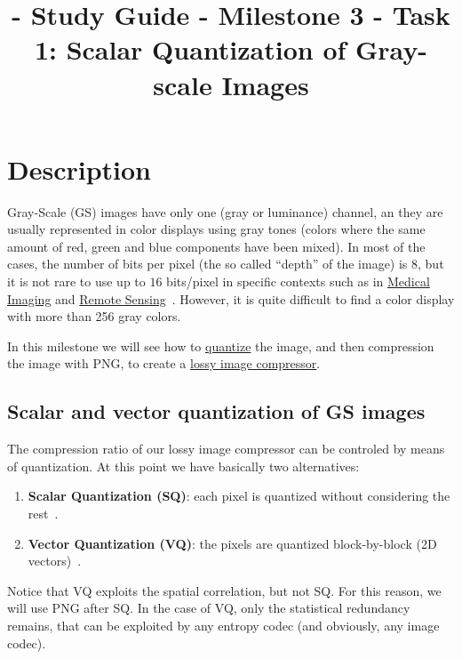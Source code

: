

\title{\SM{} - Study Guide - Milestone 3 - Task 1: Scalar Quantization of Gray-scale Images}

\maketitle
\tableofcontents

\section{Description}

Gray-Scale (GS) images have only one (gray or luminance) channel, an
they are usually represented in color displays using gray tones
(colors where the same amount of red, green and blue components have
been mixed). In most of the cases, the number of bits per pixel (the
so called ``depth'' of the image) is $8$, but it is not rare to use up
to $16$ bits/pixel in specific contexts such as in
\href{https://en.wikipedia.org/wiki/Medical_imaging}{Medical Imaging}
and \href{https://en.wikipedia.org/wiki/Remote_sensing}{Remote
  Sensing}~\cite{burger2016digital}. However, it is quite difficult to
find a color display with more than 256 gray colors.

In this milestone we will see how to
\href{https://vicente-gonzalez-ruiz.github.io/quantization/}{quantize}
the image, and then compression the image with PNG, to create a
\href{https://en.wikipedia.org/wiki/Lossy_compression}{lossy image
  compressor}.

\subsection{Scalar and vector quantization of GS images}

The compression ratio of our lossy image compressor can be controled
by means of quantization. At this point we have basically two
alternatives:
\begin{enumerate}
\item \textbf{Scalar Quantization (SQ)}: each pixel is quantized
  without considering the rest~\cite{vruiz__scalar_quantization}.
\item \textbf{Vector Quantization (VQ)}: the pixels are quantized
  block-by-block (2D vectors)~\cite{vruiz__vector_quantization}.
\end{enumerate}
Notice that VQ exploits the spatial correlation, but not SQ. For this
reason, we will use PNG after SQ. In the case of VQ, only the
statistical redundancy remains, that can be exploited by any entropy
codec (and obviously, any image codec).

